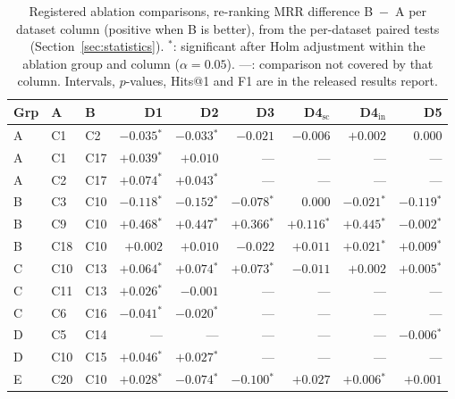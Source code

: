 \begin{table}[t]
\footnotesize
\setlength{\tabcolsep}{4pt}
\caption{Registered ablation comparisons, re-ranking MRR difference B~$-$~A per dataset column (positive when B is better), from the per-dataset paired tests (Section~\ref{sec:statistics}). $^{*}$: significant after Holm adjustment within the ablation group and column ($\alpha = 0.05$). ---: comparison not covered by that column. Intervals, $p$-values, Hits@1 and F1 are in the released results report.}
\label{tab:stats}
\begin{tabular}{lllrrrrrr}
\hline
\textbf{Grp} & \textbf{A} & \textbf{B} & \textbf{D1} & \textbf{D2} & \textbf{D3} & \textbf{D4$_{\mathrm{sc}}$} & \textbf{D4$_{\mathrm{in}}$} & \textbf{D5} \\
\hline
A & C1 & C2 & $-0.035$$^{*}$ & $-0.033$$^{*}$ & $-0.021$ & $-0.006$ & $+0.002$ & $0.000$ \\
A & C1 & C17 & $+0.039$$^{*}$ & $+0.010$ & --- & --- & --- & --- \\
A & C2 & C17 & $+0.074$$^{*}$ & $+0.043$$^{*}$ & --- & --- & --- & --- \\
\hline
B & C3 & C10 & $-0.118$$^{*}$ & $-0.152$$^{*}$ & $-0.078$$^{*}$ & $0.000$ & $-0.021$$^{*}$ & $-0.119$$^{*}$ \\
B & C9 & C10 & $+0.468$$^{*}$ & $+0.447$$^{*}$ & $+0.366$$^{*}$ & $+0.116$$^{*}$ & $+0.445$$^{*}$ & $-0.002$$^{*}$ \\
B & C18 & C10 & $+0.002$ & $+0.010$ & $-0.022$ & $+0.011$ & $+0.021$$^{*}$ & $+0.009$$^{*}$ \\
\hline
C & C10 & C13 & $+0.064$$^{*}$ & $+0.074$$^{*}$ & $+0.073$$^{*}$ & $-0.011$ & $+0.002$ & $+0.005$$^{*}$ \\
C & C11 & C13 & $+0.026$$^{*}$ & $-0.001$ & --- & --- & --- & --- \\
C & C6 & C16 & $-0.041$$^{*}$ & $-0.020$$^{*}$ & --- & --- & --- & --- \\
\hline
D & C5 & C14 & --- & --- & --- & --- & --- & $-0.006$$^{*}$ \\
D & C10 & C15 & $+0.046$$^{*}$ & $+0.027$$^{*}$ & --- & --- & --- & --- \\
\hline
E & C20 & C10 & $+0.028$$^{*}$ & $-0.074$$^{*}$ & $-0.100$$^{*}$ & $+0.027$ & $+0.006$$^{*}$ & $+0.001$ \\
\hline
\end{tabular}
\end{table}

